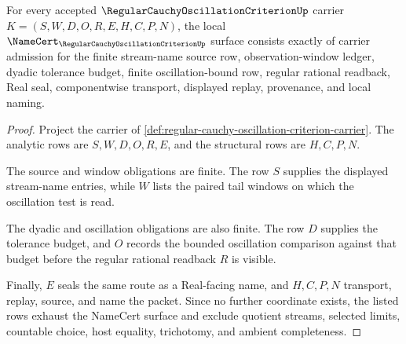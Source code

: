 \begin{theorem}
\label{thm:regular-cauchy-oscillation-criterion-namecert-obligations}
For every accepted $\RegularCauchyOscillationCriterionUp$ carrier $K=(S,W,D,O,R,E,H,C,P,N)$, the local $\NameCert_{\RegularCauchyOscillationCriterionUp}$ surface consists exactly of carrier admission for the finite stream-name source row, observation-window ledger, dyadic tolerance budget, finite oscillation-bound row, regular rational readback, Real seal, componentwise transport, displayed replay, provenance, and local naming.
\end{theorem}
\begin{proof}
Project the carrier of \autoref{def:regular-cauchy-oscillation-criterion-carrier}. The analytic rows are $S,W,D,O,R,E$, and the structural rows are $H,C,P,N$.

The source and window obligations are finite. The row $S$ supplies the displayed stream-name entries, while $W$ lists the paired tail windows on which the oscillation test is read.

The dyadic and oscillation obligations are also finite. The row $D$ supplies the tolerance budget, and $O$ records the bounded oscillation comparison against that budget before the regular rational readback $R$ is visible.

Finally, $E$ seals the same route as a Real-facing name, and $H,C,P,N$ transport, replay, source, and name the packet. Since no further coordinate exists, the listed rows exhaust the NameCert surface and exclude quotient streams, selected limits, countable choice, host equality, trichotomy, and ambient completeness.
\end{proof}

